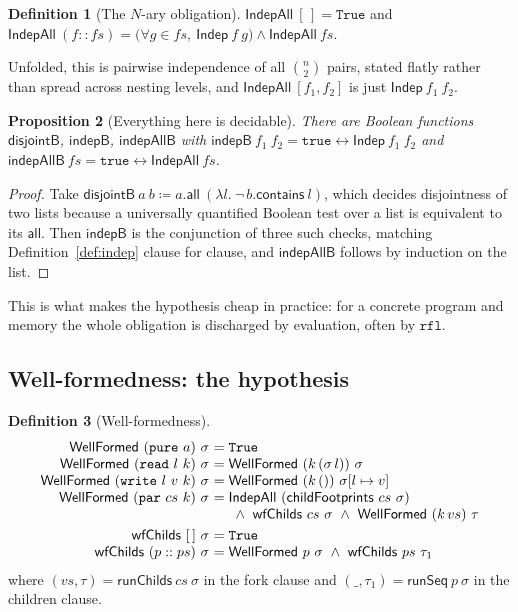 \documentclass[11pt,a4paper]{article}
\theoremstyle{definition}
\newtheorem{definition}{Definition}
\theoremstyle{plain}
\newtheorem{proposition}[definition]{Proposition}
\theoremstyle{remark}
\newcommand{\st}{\sigma}
\newcommand{\runSeq}{\mathsf{runSeq}}
\newcommand{\wf}{\mathsf{WellFormed}}
\newcommand{\Indep}{\mathsf{Indep}}
\newcommand{\upd}[3]{#1[#2 \mapsto #3]}
\begin{document}
\begin{definition}[The $N$-ary obligation]\label{def:indepall}
$\mathsf{IndepAll}\ [\,] = \mathtt{True}$ and
$\mathsf{IndepAll}\ (f :: fs) = \bigl(\forall g \in fs,\ \Indep\ f\ g\bigr) \wedge \mathsf{IndepAll}\ fs$.
\end{definition}

Unfolded, this is pairwise independence of all $\binom{n}{2}$ pairs, stated flatly rather
than spread across nesting levels, and $\mathsf{IndepAll}\ [f_1,f_2]$ is just
$\Indep\ f_1\ f_2$.

\begin{proposition}[Everything here is decidable]\label{prop:decide}
There are Boolean functions $\mathsf{disjointB}$, $\mathsf{indepB}$, $\mathsf{indepAllB}$
with $\mathsf{indepB}\ f_1\ f_2 = \mathtt{true} \leftrightarrow \Indep\ f_1\ f_2$ and
$\mathsf{indepAllB}\ fs = \mathtt{true} \leftrightarrow \mathsf{IndepAll}\ fs$.
\end{proposition}

\begin{proof}
Take $\mathsf{disjointB}\ a\ b \coloneqq a.\mathsf{all}\ (\lambda l.\ \neg\,b.\mathsf{contains}\ l)$,
which decides disjointness of two lists because a universally quantified Boolean test over a
list is equivalent to its $\mathsf{all}$. Then $\mathsf{indepB}$ is the conjunction of three
such checks, matching Definition~\ref{def:indep} clause for clause, and
$\mathsf{indepAllB}$ follows by induction on the list.
\end{proof}

This is what makes the hypothesis cheap in practice: for a concrete program and memory the
whole obligation is discharged by evaluation, often by $\mathtt{rfl}$.

\subsection{Well-formedness: the hypothesis}\label{sec:indep:wf}

\begin{definition}[Well-formedness]\label{def:wf}
\[
\begin{array}{r@{\ }l}
  \wf\ (\texttt{pure}\ a)\ \st &= \mathtt{True} \\
  \wf\ (\texttt{read}\ l\ k)\ \st &= \wf\ (k\,(\st\,l))\ \st \\
  \wf\ (\texttt{write}\ l\ v\ k)\ \st &= \wf\ (k\,())\ \upd{\st}{l}{v} \\
  \wf\ (\texttt{par}\ cs\ k)\ \st &= \mathsf{IndepAll}\ (\mathsf{childFootprints}\ cs\ \st) \\
    &\phantom{{}={}} {}\wedge\ \mathsf{wfChilds}\ cs\ \st
      \ \wedge\ \wf\ (k\,vs)\ \tau \\[3pt]
  \mathsf{wfChilds}\ [\,]\ \st &= \mathtt{True} \\
  \mathsf{wfChilds}\ (p :: ps)\ \st &= \wf\ p\ \st \ \wedge\ \mathsf{wfChilds}\ ps\ \tau_1
\end{array}
\]
where $(vs,\tau) = \mathsf{runChilds}\ cs\ \st$ in the fork clause and
$(\_,\tau_1) = \runSeq\ p\ \st$ in the children clause.
\end{definition}
\end{document}
